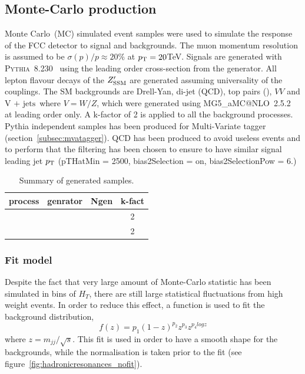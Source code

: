 \documentclass{cernrep}
\newcommand*{\hht}{\ensuremath{H_{\ensuremath{T}}}}
\newcommand*{\vj}{\ensuremath{\text{V + jets}}}
\begin{document}
\subsection{Monte-Carlo production}
\label{subsec:mcprod}

Monte Carlo~(MC) simulated event samples were used to simulate the response of the FCC detector to signal and backgrounds. The muon momentum resolution is assumed to be $\sigma(p)/p \approx 20\%$ at $p_{\text{T}}= 20 $TeV. Signals are generated with {\scshape Pythia}~8.230~\cite{Sjostrand:2014zea} using the leading order cross-section from the generator.
All lepton flavour decays of the $Z^{\prime}_{\mathrm{SSM}}$ are generated assuming universality of the couplings.
The SM backgrounds are Drell-Yan, di-jet (QCD), top pairs (\ttbar), $VV$ and \vj\ where $V=W/Z$, which were generated using {\scshape MG5\_}a{\scshape MC@NLO}~2.5.2~\cite{Alwall:2014} at leading order only. A k-factor of 2 is applied to all the background processes.
Pythia independent samples has been produced for Multi-Variate tagger (section~\ref{subsec:mvatagger}). QCD has been produced to avoid useless events and to perform that the filtering has been chosen to ensure to have similar signal leading jet $p\sb{\scriptstyle\mathrm{T}}$ (pTHatMin = 2500, bias2Selection = on, bias2SelectionPow = 6.)

\begin{table}[!htb]\centering
\begin{tabular}{|c|c|c|c|}
\hline
\hline		
process & genrator & Ngen & k-fact \\
\hline		
 & & & 2 \\
 & & & 2 \\
\hline
\hline
\end{tabular}
\caption{Summary of generated samples.}
\label{tab:MCtable}
\end{table}

\subsubsection{Fit model}
Despite the fact that very large amount of Monte-Carlo statistic has been simulated in bins of $\hht$, there are still large statistical fluctuations from high weight events.
In order to reduce this effect, a function is used to fit the background distribution,
\begin{equation}
f(z)=p_1(1-z)^{p_2}z^{p_3}z^{p_{4}logz}
\end{equation}
where $z=m_{jj}/\sqrt{s}$. This fit is used in order to have a smooth shape for the backgrounds, while the normalisation is taken prior to the fit (see figure~\ref{fig:hadronicresonances_nofit}).
\end{document}
